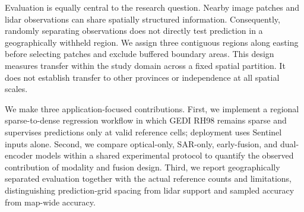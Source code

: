 Evaluation is equally central to the research question. Nearby image patches and lidar observations can share spatially structured information. Consequently, randomly separating observations does not directly test prediction in a geographically withheld region. We assign three contiguous regions along easting before selecting patches and exclude buffered boundary areas. This design measures transfer within the study domain across a fixed spatial partition. It does not establish transfer to other provinces or independence at all spatial scales.

We make three application-focused contributions. First, we implement a regional sparse-to-dense regression workflow in which GEDI RH98 remains sparse and supervises predictions only at valid reference cells; deployment uses Sentinel inputs alone. Second, we compare optical-only, SAR-only, early-fusion, and dual-encoder models within a shared experimental protocol to quantify the observed contribution of modality and fusion design. Third, we report geographically separated evaluation together with the actual reference counts and limitations, distinguishing prediction-grid spacing from lidar support and sampled accuracy from map-wide accuracy.
